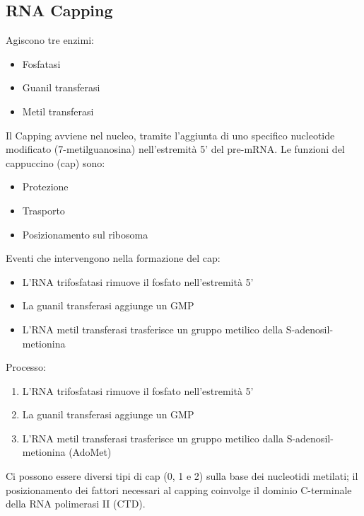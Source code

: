 \documentclass{article}
\begin{document}
\subsection{RNA Capping}
Agiscono tre enzimi: 
\begin{itemize}
    \item Fosfatasi
    \item Guanil transferasi
    \item Metil transferasi
\end{itemize}
Il Capping avviene nel nucleo, tramite l'aggiunta di uno specifico nucleotide modificato (7-metilguanosina) nell'estremità 5' del pre-mRNA. Le funzioni del cappuccino (cap) sono:
\begin{itemize}
    \item Protezione
    \item Trasporto
    \item Posizionamento sul ribosoma
\end{itemize}
Eventi che intervengono nella formazione del cap:
\begin{itemize}
    \item L'RNA trifosfatasi rimuove il fosfato nell'estremità 5'
    \item La guanil transferasi aggiunge un GMP
    \item L'RNA metil transferasi trasferisce un gruppo metilico della S-adenosil-metionina
\end{itemize}
Processo:
\begin{enumerate}
    \item L'RNA trifosfatasi rimuove il fosfato nell'estremità 5'
    \item La guanil transferasi aggiunge un GMP
    \item L'RNA metil transferasi trasferisce un gruppo metilico dalla S-adenosil-metionina (AdoMet)
\end{enumerate}
Ci possono essere diversi tipi di cap (0, 1 e 2) sulla base dei nucleotidi metilati; il posizionamento dei fattori necessari al capping coinvolge
il dominio C-terminale della RNA polimerasi II (CTD).
\end{document}
